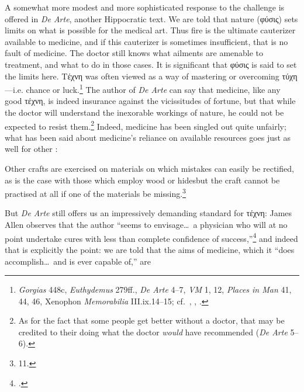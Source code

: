 \documentclass[11pt,letterpaper,oneside]{amsart} %
\begin{document}







A somewhat more modest and more sophisticated response to the challenge is offered in \emph{De Arte}, another Hippocratic text. We are told that nature (φύσις) sets limits on what is possible for the medical art. Thus fire is the ultimate cauterizer available to medicine, and if this cauterizer is sometimes insufficient, that is no fault of medicine. The doctor still knows what ailments are amenable to treatment, and what to do in those cases. It is significant that φύσις is said to set the limits here. Τέχνη was often viewed as a way of mastering or overcoming τύχη---i.e. chance or luck.\footnote{\emph{Gorgias} 448c, \emph{Euthydemus} 279ff., \emph{De Arte} 4--7, \emph{VM} 1, 12, \emph{Places in Man} 41, 44, 46, Xenophon \emph{Memorabilia} III.ix.14--15; cf.\ \citet[54--6]{vlastos1946eap}, \citet[108, 123--4]{heinimann1961vpt}, \citet{allen1994}.} The author of \emph{De Arte} can say that medicine, like any good τέχνη, is indeed insurance against the vicissitudes of fortune, but that while the doctor will understand the inexorable workings of nature, he could not be expected to resist them.\footnote{As for the fact that some people get better without a doctor, that may be credited to their doing what the doctor \emph{would} have recommended (\emph{De Arte} 5--6).} Indeed, medicine has been singled out quite unfairly; what has been said about medicine's reliance on available resources goes just as well for other \technai:\begin{squote}[GREEK]

\vspace{0.05in}

\noindent Other crafts are exercised on materials on which mistakes can easily be rectified, as is the case with those which employ wood or hides\sdots but the craft cannot be practised at all if one of the materials be missing.\footnote{ 11.}\end{squote} But \emph{De Arte} still offers us an impressively demanding standard for τέχνη: James Allen observes that the author ``seems to envisage\ldots\ a physician who will at no point undertake cures with less than complete confidence of success,''\footnote{\citet[p.\ 85]{allen1994}.} and indeed that is explicitly the point: we are told that the aims of medicine, which it ``does accomplish\ldots\ and is ever capable of,'' are \begin{squote}[QUOTE]


\end{squote}
\end{document}
